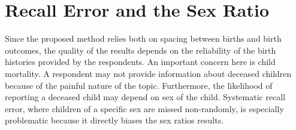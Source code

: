 \documentclass[12pt,letterpaper]{article}
\begin{document}
\section{Recall Error and the Sex Ratio}

\setcounter{figure}{0}
\setcounter{table}{0}


% 

Since the proposed method relies both on spacing between births and  birth outcomes, the 
quality of the results depends on the reliability of the birth 
histories provided by the respondents.
An important concern here is child mortality.
A respondent may not provide information about deceased children because of
the painful nature of the topic.
Furthermore, the likelihood of reporting a deceased child may depend on sex of the child. 
Systematic recall error, where children of a specific sex are missed non-randomly, 
is especially problematic because it directly biases the sex ratios results.
\end{document}
